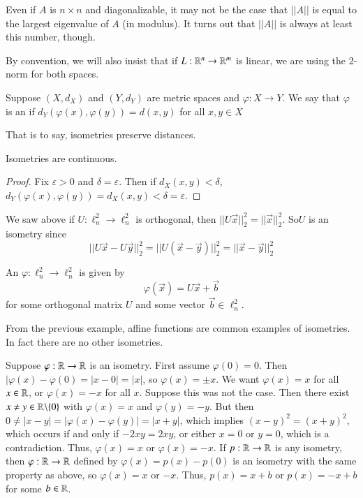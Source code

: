 Even if $A$ is $n\times n$ and diagonalizable, it may not be the case that $||A||$ is equal to the largest eigenvalue of $A$ (in modulus). It turns out that $||A||$ is always at least this number, though.

By convention, we will also insist that if $L:\mathbb R^n\rightarrow \mathbb R^m$ is linear, we are using the $2$-norm for both spaces.

\begin{definition}
    Suppose $(X,d_X)$ and $(Y,d_Y)$ are metric spaces and $\varphi:X\rightarrow Y$. We say that $\varphi$ is an  if $d_Y(\varphi(x),\varphi(y)) = d(x,y)$ for all $x,y \in X$
\end{definition}

That is to say, isometries preserve distances.

\begin{proposition}
    Isometries are continuous.
\end{proposition}
\begin{proof}
    Fix $\varepsilon > 0$ and $\delta = \varepsilon$. Then if $d_X(x,y) < \delta,$ $d_Y(\varphi(x),\varphi(y)) = d_X(x,y) < \delta = \varepsilon$.
\end{proof}

\begin{example}
    We saw above if $U:\ell_n^2\rightarrow \ell_n^2$ is orthogonal, then $||U\vec{x}||_2^2 = ||\vec{x}||_2^2$. So$ U$ is an isometry since $$||U\vec{x} - U\vec{y}||_2^2 = ||U(\vec{x}-\vec{y})||_2^2 = ||\vec{x}-\vec{y}||_2^2$$
\end{example}

\begin{definition}
    An  $\varphi:\ell_n^2\rightarrow \ell_n^2$ is given by $$\varphi(\vec{x}) = U\vec{x}+\vec{b}$$ for some orthogonal matrix $U$ and some vector $\vec{b} \in \ell_n^2$.
\end{definition}

From the previous example, affine functions are common examples of isometries. In fact there are no other isometries.

\begin{example}
    Suppose $\varphi:\mathbb R\rightarrow \mathbb R$ is an isometry. First assume $\varphi(0) = 0$. Then $|\varphi(x)-\varphi(0) = |x-0| = |x|$, so $\varphi(x) = \pm x$. We want $\varphi(x) = x$ for all $x \in \mathbb R$, or $\varphi(x) = -x$ for all $x$. Suppose this was not the case. Then there exist $x \neq y \in \mathbb R\backslash\{0\}$ with $\varphi(x) = x$ and $\varphi(y) = -y$. But then $0 \neq |x-y| = |\varphi(x) - \varphi(y)| = |x+y|$, which implies $(x-y)^2 = (x+y)^2$, which occurs if and only if $-2xy = 2xy$, or either $x = 0$ or $y = 0$, which is a contradiction. Thus, $\varphi(x) = x$ or $\varphi(x) = -x$. If $p:\mathbb R\rightarrow \mathbb R$ is any isometry, then $\varphi:\mathbb R\rightarrow \mathbb R$ defined by $\varphi(x) = p(x) - p(0)$ is an isometry with the same property as above, so $\varphi(x) = x$ or $-x$. Thus, $p(x) = x+b$ or $p(x) = -x+b$ for some $b \in \mathbb R$.
\end{example}

